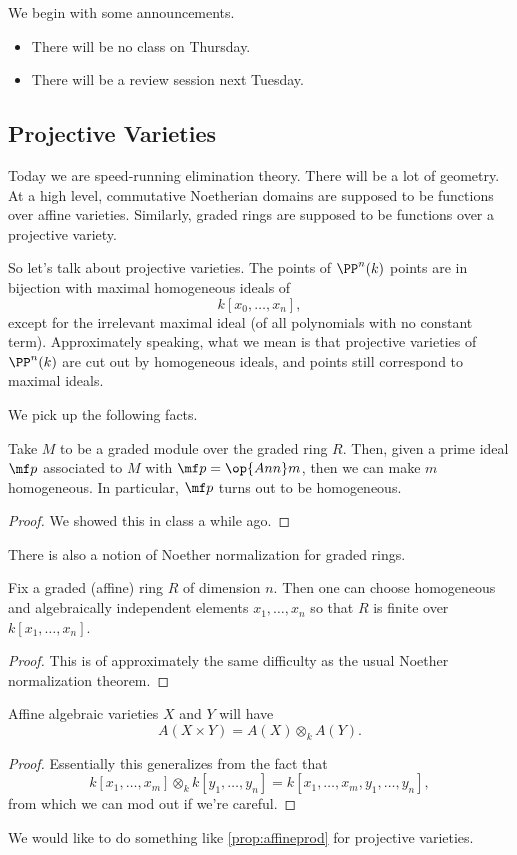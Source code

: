 
We begin with some announcements.
\begin{itemize}
	\item There will be no class on Thursday.
	\item There will be a review session next Tuesday.
\end{itemize}

\subsection{Projective Varieties}
Today we are speed-running elimination theory. There will be a lot of geometry. At a high level, commutative Noetherian domains are supposed to be functions over affine varieties. Similarly, graded rings are supposed to be functions over a projective variety.

So let's talk about projective varieties. The points of $\PP^n(k)$ points are in bijection with maximal homogeneous ideals of
\[k[x_0,\ldots,x_n],\]
except for the irrelevant maximal ideal (of all polynomials with no constant term). Approximately speaking, what we mean is that projective varieties of $\PP^n(k)$ are cut out by homogeneous ideals, and points still correspond to maximal ideals.

We pick up the following facts.
\begin{proposition}
	Take $M$ to be a graded module over the graded ring $R$. Then, given a prime ideal $\mf p$ associated to $M$ with $\mf p=\op{Ann}m$, then we can make $m$ homogeneous. In particular, $\mf p$ turns out to be homogeneous.
\end{proposition}
\begin{proof}
	We showed this in class a while ago.
\end{proof}
There is also a notion of Noether normalization for graded rings.
\begin{proposition}
	Fix a graded (affine) ring $R$ of dimension $n$. Then one can choose homogeneous and algebraically independent elements $x_1,\ldots,x_n$ so that $R$ is finite over $k[x_1,\ldots,x_n]$.
\end{proposition}
\begin{proof}
	This is of approximately the same difficulty as the usual Noether normalization theorem.
\end{proof}
\begin{proposition} \label{prop:affineprod}
	Affine algebraic varieties $X$ and $Y$ will have
	\[A(X\times Y)=A(X)\otimes_kA(Y).\]
\end{proposition}
\begin{proof}
	Essentially this generalizes from the fact that
	\[k[x_1,\ldots,x_m]\otimes_kk[y_1,\ldots,y_n]=k[x_1,\ldots,x_m,y_1,\ldots,y_n],\]
	from which we can mod out if we're careful.
\end{proof}
We would like to do something like \autoref{prop:affineprod} for projective varieties.

